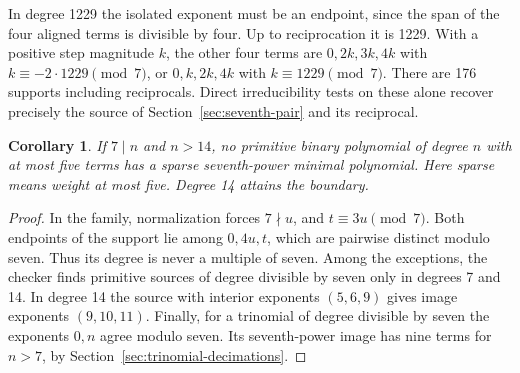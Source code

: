 \documentclass[11pt]{article}
\newtheorem{corollary}[theorem]{Corollary}
\begin{document}
In degree 1229 the isolated exponent must be an endpoint, since the
span of the four aligned terms is divisible by four. Up to
reciprocation it is 1229. With a positive step magnitude \(k\), the
other four terms are \(0,2k,3k,4k\) with \(k\equiv-2\cdot1229\pmod7\),
or \(0,k,2k,4k\) with \(k\equiv1229\pmod7\).
There are 176 supports including reciprocals. Direct irreducibility
tests on these alone recover precisely the source of
Section~\ref{sec:seventh-pair} and its reciprocal.

\begin{corollary}
If \(7\mid n\) and \(n>14\), no primitive binary polynomial of degree
\(n\) with at most five terms has a sparse seventh-power minimal
polynomial. Here sparse means weight at most five. Degree 14 attains
the boundary.
\end{corollary}
\begin{proof}
In the family, normalization forces \(7\nmid u\), and
\(t\equiv3u\pmod7\). Both endpoints of the support lie among
\(0,4u,t\), which are pairwise distinct modulo seven. Thus its
degree is never a multiple of seven. Among the exceptions, the
checker finds primitive sources of degree divisible by seven only
in degrees 7 and 14. In degree 14 the source with interior exponents
\((5,6,9)\) gives image exponents \((9,10,11)\). Finally, for a
trinomial of degree divisible by seven the exponents \(0,n\) agree
modulo seven. Its seventh-power image has nine terms for \(n>7\),
by Section~\ref{sec:trinomial-decimations}.
\end{proof}
\end{document}
